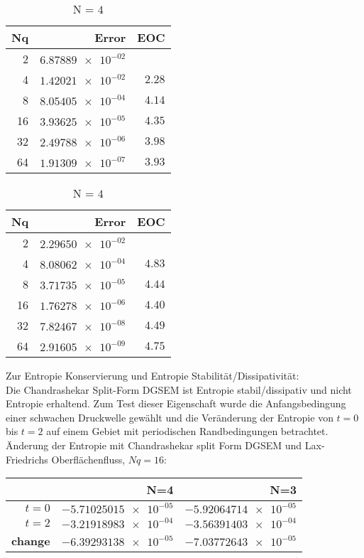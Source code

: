 \documentclass[11pt]{scrartcl}
\begin{document}
\begin{table}[H]
\parbox{.45\linewidth}{
\centering
    \begin{tabular}{|r|r|r|}
    \hline\hline
    \textbf{Nq} & \textbf{Error} & \textbf{EOC} \\\hline
    2 & $\num{6.87889e-02}$ & $\num{}$ \\
    4 & $\num{1.42021e-02}$ & $\num{2.28}$ \\
    8 & $\num{8.05405e-04}$ & $\num{4.14}$ \\
    16 & $\num{3.93625e-05}$ & $\num{4.35}$ \\
    32 & $\num{2.49788e-06}$ & $\num{3.98}$ \\
    64 & $\num{1.91309e-07}$ & $\num{3.93}$ \\\hline\hline
  \end{tabular} 
  \caption{N = $3$}
  }
  \parbox{.45\linewidth}{
	\centering
    \begin{tabular}{|r|r|r|}
    \hline\hline
    \textbf{Nq} & \textbf{Error} & \textbf{EOC} \\\hline
    2 & $\num{2.29650e-02}$ & $\num{}$ \\
    4 & $\num{8.08062e-04}$ & $\num{4.83}$ \\
    8 & $\num{3.71735e-05}$ & $\num{4.44}$ \\
    16 & $\num{1.76278e-06}$ & $\num{4.40}$ \\
    32 & $\num{7.82467e-08}$ & $\num{4.49}$ \\
    64 & $\num{2.91605e-09}$ & $\num{4.75}$ \\\hline\hline
  \end{tabular}
   \caption{N = $4$}
  }
\end{table}
Zur Entropie Konservierung und Entropie Stabilität/Dissipativität: \\
Die Chandrashekar Split-Form DGSEM ist Entropie stabil/dissipativ und nicht Entropie erhaltend. 
Zum Test dieser Eigenschaft wurde die Anfangsbedingung einer schwachen Druckwelle gewählt und die Veränderung der Entropie von $t=0$ bis $t=2$ auf einem Gebiet mit periodischen Randbedingungen betrachtet.\\
Änderung der Entropie mit Chandrashekar split Form DGSEM und Lax-Friedrichs Oberflächenfluss, $Nq = 16$: 
\begin{table}[H]
\centering
\begin{tabular}{|r|r|r|}
    \hline\hline
     & \textbf{N=4} & \textbf{N=3} \\\hline
    \textbf{$t=0$} & $\num{-5.71025015e-05}$ & $\num{-5.92064714e-05}$ \\
    \textbf{$t=2$} &  $\num{-3.21918983e-04}$ & $\num{-3.56391403e-04}$ \\
    \textbf{change} & $\num{-6.39293138e-05}$ & $\num{-7.03772643e-05}$ \\\hline\hline
\end{tabular}
\end{table}
\end{document}
